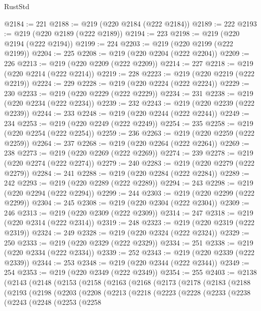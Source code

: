 \begin{lexlean}{RustStd}
\begin{coremodule}
@2184 := 221
@2188 := @219 (@220 @2184 (@222 @2184))
@2189 := 222
@2193 := @219 (@220 @2189 (@222 @2189))
@2194 := 223
@2198 := @219 (@220 @2194 (@222 @2194))
@2199 := 224
@2203 := @219 (@220 @2199 (@222 @2199))
@2204 := 225
@2208 := @219 (@220 @2204 (@222 @2204))
@2209 := 226
@2213 := @219 (@220 @2209 (@222 @2209))
@2214 := 227
@2218 := @219 (@220 @2214 (@222 @2214))
@2219 := 228
@2223 := @219 (@220 @2219 (@222 @2219))
@2224 := 229
@2228 := @219 (@220 @2224 (@222 @2224))
@2229 := 230
@2233 := @219 (@220 @2229 (@222 @2229))
@2234 := 231
@2238 := @219 (@220 @2234 (@222 @2234))
@2239 := 232
@2243 := @219 (@220 @2239 (@222 @2239))
@2244 := 233
@2248 := @219 (@220 @2244 (@222 @2244))
@2249 := 234
@2253 := @219 (@220 @2249 (@222 @2249))
@2254 := 235
@2258 := @219 (@220 @2254 (@222 @2254))
@2259 := 236
@2263 := @219 (@220 @2259 (@222 @2259))
@2264 := 237
@2268 := @219 (@220 @2264 (@222 @2264))
@2269 := 238
@2273 := @219 (@220 @2269 (@222 @2269))
@2274 := 239
@2278 := @219 (@220 @2274 (@222 @2274))
@2279 := 240
@2283 := @219 (@220 @2279 (@222 @2279))
@2284 := 241
@2288 := @219 (@220 @2284 (@222 @2284))
@2289 := 242
@2293 := @219 (@220 @2289 (@222 @2289))
@2294 := 243
@2298 := @219 (@220 @2294 (@222 @2294))
@2299 := 244
@2303 := @219 (@220 @2299 (@222 @2299))
@2304 := 245
@2308 := @219 (@220 @2304 (@222 @2304))
@2309 := 246
@2313 := @219 (@220 @2309 (@222 @2309))
@2314 := 247
@2318 := @219 (@220 @2314 (@222 @2314))
@2319 := 248
@2323 := @219 (@220 @2319 (@222 @2319))
@2324 := 249
@2328 := @219 (@220 @2324 (@222 @2324))
@2329 := 250
@2333 := @219 (@220 @2329 (@222 @2329))
@2334 := 251
@2338 := @219 (@220 @2334 (@222 @2334))
@2339 := 252
@2343 := @219 (@220 @2339 (@222 @2339))
@2344 := 253
@2348 := @219 (@220 @2344 (@222 @2344))
@2349 := 254
@2353 := @219 (@220 @2349 (@222 @2349))
@2354 := 255
@2403 := @2138
    (@2143
      (@2148
        (@2153
          (@2158
            (@2163
              (@2168
                (@2173
                  (@2178
                    (@2183
                      (@2188
                        (@2193
                          (@2198
                            (@2203
                              (@2208
                                (@2213
                                  (@2218
                                    (@2223
                                      (@2228
                                        (@2233
                                          (@2238
                                            (@2243
                                              (@2248
                                                (@2253
                                                  (@2258

\end{coremodule}
\end{lexlean}
